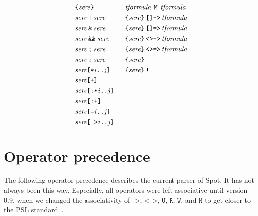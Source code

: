 \documentclass[a4paper,twoside,10pt,DIV=12]{scrreprt}
\newcommand{\U}{\mathbin{\texttt{U}}}
\newcommand{\R}{\mathbin{\texttt{R}}}
\newcommand{\M}{\mathbin{\texttt{M}}}
\newcommand{\W}{\mathbin{\texttt{W}}}
\DeclareMathOperator{\NOT}{\texttt{!}}
\newcommand{\IMPLIES}{\mathbin{\texttt{->}}}
\newcommand{\EQUIV}{\mathbin{\texttt{<->}}}
\newcommand{\OR}{\mathbin{\texttt{|}}}
\newcommand{\AND}{\mathbin{\texttt{\&}}}
\newcommand{\ANDALT}{\mathbin{\texttt{\&\&}}}
\newcommand{\FUSION}{\mathbin{\texttt{:}}}
\newcommand{\CONCAT}{\mathbin{\texttt{;}}}
\newcommand{\0}{\texttt{0}}
\newcommand{\1}{\texttt{1}}
\newcommand{\STAR}[1]{\texttt{[*#1]}}
\newcommand{\FSTAR}[1]{\texttt{[:*#1]}}
\newcommand{\EQUAL}[1]{\texttt{[=#1]}}
\newcommand{\GOTO}[1]{\texttt{[->#1]}}
\newcommand{\PLUS}{\texttt{[+]}}
\newcommand{\FPLUS}{\texttt{[:+]}}
\newcommand{\Esuffix}{\texttt{<>->}}
\newcommand{\Asuffix}{\texttt{[]->}}
\newcommand{\EsuffixEQ}{\texttt{<>=>}}
\newcommand{\AsuffixEQ}{\texttt{[]=>}}
\newcommand\mvar[1]{\ensuremath{\mathit{#1}}}
\newcommand\tsamp[1]{\text{\texttt{#1}}}
\newcommand\msamp[1]{#1}
\begin{document}
\begin{align*}
  \mid{}&\tsamp{\{}\mathit{sere}\tsamp{\}}                      &   \mid{}&\mathit{tformula}\,\msamp{\M}\,\mathit{tformula} \\
  \mid{}&\mathit{sere}\msamp{\OR}\mathit{sere}                  &   \mid{}&\tsamp{\{}\mathit{sere}\tsamp{\}}\,\msamp{\Asuffix}\,\mathit{tformula}\\
  \mid{}&\mathit{sere}\msamp{\AND}\mathit{sere}                 &   \mid{}&\tsamp{\{}\mathit{sere}\tsamp{\}}\,\msamp{\AsuffixEQ}\,\mathit{tformula}\\
  \mid{}&\mathit{sere}\msamp{\ANDALT}\mathit{sere}              &   \mid{}&\tsamp{\{}\mathit{sere}\tsamp{\}}\,\msamp{\Esuffix}\,\mathit{tformula}\\
  \mid{}&\mathit{sere}\msamp{\CONCAT}\mathit{sere}              &   \mid{}&\tsamp{\{}\mathit{sere}\tsamp{\}}\,\msamp{\EsuffixEQ}\,\mathit{tformula} \\
  \mid{}&\mathit{sere}\msamp{\FUSION}\mathit{sere}              &   \mid{}&\tsamp{\{}\mathit{sere}\tsamp{\}} \\
  \mid{}&\mathit{sere}\msamp{\STAR{\mvar{i}..\mvar{j}}}         &   \mid{}&\tsamp{\{}\mathit{sere}\tsamp{\}}\msamp{\NOT} \\
  \mid{}&\mathit{sere}\msamp{\PLUS}                      \\
  \mid{}&\mathit{sere}\msamp{\FSTAR{\mvar{i}..\mvar{j}}} \\
  \mid{}&\mathit{sere}\msamp{\FPLUS}                     \\
  \mid{}&\mathit{sere}\msamp{\EQUAL{\mvar{i}..\mvar{j}}} \\
  \mid{}&\mathit{sere}\msamp{\GOTO{\mvar{i}..\mvar{j}}}  \\
\end{align*}

\section{Operator precedence}

The following operator precedence describes the current parser of
Spot.  It has not always been this way.  Especially, all operators
were left associative until version 0.9, when we changed the
associativity of $\IMPLIES$, $\EQUIV$, $\U$, $\R$, $\W$, and $\M$ to get closer
to the PSL standard~\cite{psl.04.lrm,eisner.06.psl}.
\end{document}
